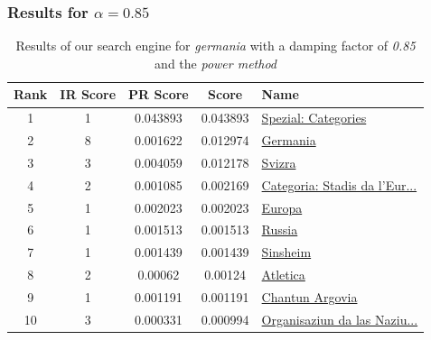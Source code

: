 \documentclass[10pt]{beamer}
\begin{document}
\begin{frame}
  \frametitle{Results for $\alpha = 0.85$}
  \begin{table}
    \begin{tabular}{ | c | c | c | c | l | }
      \hline
      Rank & IR Score & PR Score &  Score & Name \\ \hline
      1 & 1 & 0.043893 & 0.043893 & \href{http://rm.wikipedia.org/wiki/Spezial:Categories}{Spezial: Categories} \\ \hline
      2 & 8 & 0.001622 & 0.012974 & \href{http://rm.wikipedia.org/wiki/Germania}{Germania} \\ \hline
      3 & 3 & 0.004059 & 0.012178 & \href{http://rm.wikipedia.org/wiki/Svizra}{Svizra} \\ \hline
      4 & 2 & 0.001085 & 0.002169 & \href{http://rm.wikipedia.org/wiki/Categoria:Stadis_da_l'Europa}{Categoria: Stadis da l'Eur...} \\ \hline
      5 & 1 & 0.002023 & 0.002023 & \href{http://rm.wikipedia.org/wiki/Europa}{Europa} \\ \hline
      6 & 1 & 0.001513 & 0.001513 & \href{http://rm.wikipedia.org/wiki/Russia}{Russia} \\ \hline
      7 & 1 & 0.001439 & 0.001439 & \href{http://rm.wikipedia.org/wiki/Sinsheim}{Sinsheim} \\ \hline
      8 & 2 & 0.00062 & 0.00124 & \href{http://rm.wikipedia.org/wiki/Atletica}{Atletica} \\ \hline
      9 & 1 & 0.001191 & 0.001191 & \href{http://rm.wikipedia.org/wiki/Chantun_Argovia}{Chantun Argovia} \\ \hline
      10 & 3 & 0.000331 & 0.000994 & \href{http://rm.wikipedia.org/wiki/Organisaziun_da_las_Naziuns_unidas}{Organisaziun da las Naziu...} \\ \hline
    \end{tabular}
    \caption{Results of our search engine for \emph{germania} with a damping factor of \emph{0.85} and the \emph{power method}}
    \label{table_d=0.85}
  \end{table}
\end{frame}
\end{document}
